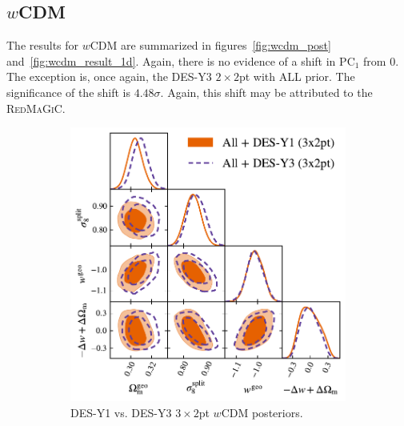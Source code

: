 \subsection{\texorpdfstring{$w$CDM}{wCDM}}
The results for $w$CDM are summarized in figures~\ref{fig:wcdm_post} and~\ref{fig:wcdm_result_1d}. Again, there is no evidence of a shift in $\mathrm{PC}_1$ from 0. The exception is, once again, the DES-Y3 $2\times2$pt with ALL prior. The significance of the shift is $4.48\sigma$. Again, this shift may be attributed to the \textsc{RedMaGiC}. 
\begin{figure}[ht]
	\centering
	\begin{subfigure}[b]{0.45\textwidth}
		\includegraphics[width=\textwidth]{plots/plot205v2.pdf}
		\caption{DES-Y1 vs. DES-Y3 $3\times2$pt $w$CDM posteriors.}
		\label{fig:y3_y1_wcdm}
	\end{subfigure}
	\begin{subfigure}[b]{0.45\textwidth}

\end{subfigure}
\end{figure}
